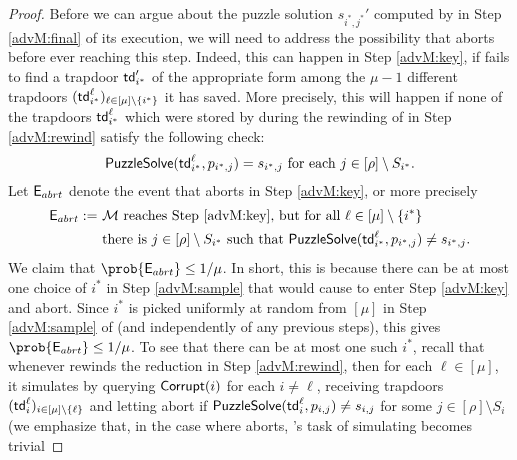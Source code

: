 \begin{proof}
  Before we can argue about the puzzle solution \(s_{i^{*},j^{*}}'\) computed by
  \redM in Step \ref{advM:final} of its execution,
  we will need to address the possibility that \redM aborts
  before ever reaching this step.
  Indeed, this can happen in Step \ref{advM:key},
  if \redM fails to find a trapdoor \(\mathsf{td}_{i^{*}}'\)
  of the appropriate form among the \(\mu - 1\)
  different trapdoors \((\mathsf{td}_{i^{*}}^{\ell})_{\ell \in [\mu] \setminus \{i^{*}\}}\) it has saved.
  More precisely, this will happen if
  none of the trapdoors \(\mathsf{td}_{i^{*}}^{\ell}\)
  which were stored by \redM during the rewinding of \redR in Step \ref{advM:rewind}
  satisfy the following check:
  \begin{equation}\label{skcheck}
  \mathsf{PuzzleSolve}(\mathsf{td}_{i^{*}}^{\ell},p_{i^{*},j}) = s_{i^{*},j}
  \text{ for each } j \in [\rho] \setminus S_{i^{*}}.
  \end{equation}
  Let \(\mathsf{E}_{abrt}\) denote the event that \redM aborts in Step \ref{advM:key}, or more precisely
  \begin{align}
    \eventE_{abrt} := & \text{ \redM reaches Step \ref{advM:key}, but for all } \ell \in [\mu] \setminus \{i^{*}\}\notag\\
    & \text{ there is } j \in [\rho] \setminus S_{i^{*}}
    \text{ such that } \PuzzleSolve(\td_{i^{*}}^{\ell},p_{i^{*},j}) \ne s_{i^{*},j}. \notag
  \end{align}
  We claim that \(\prob{\eventE_{abrt}} \le 1/\mu\).
  In short, this is because there can be at most one choice of \(i^{*}\)
  in Step \ref{advM:sample} that would cause \redM to enter Step \ref{advM:key} and abort.
  Since \(i^{*}\) is picked uniformly at random from \([\mu]\)
  in Step \ref{advM:sample} of \redM (and independently of any previous steps),
  this gives \(\prob{\eventE_{abrt}} \le 1/\mu\).
  To see that there can be at most one such \(i^{*}\),
  recall that whenever \redM rewinds the reduction \redR
  in Step \ref{advM:rewind},
  then for each \(\ell \in [\mu]\),
  it simulates \advA by querying \(\mathsf{Corrupt}(i)\) for each \(i \ne \ell\),
  receiving trapdoors \((\mathsf{td}_{i}^{\ell})_{i \in [\mu] \setminus \{\ell\}}\)
  and letting \advA abort if
  \(\mathsf{PuzzleSolve}(\mathsf{td}_{i}^{\ell},p_{i,j}) \ne s_{i,j}\) for some \(j \in [\rho] \setminus S_{i}\)
  (we emphasize that, in the case where \advA aborts, \redM's task of simulating \advA becomes trivial

\end{proof}
